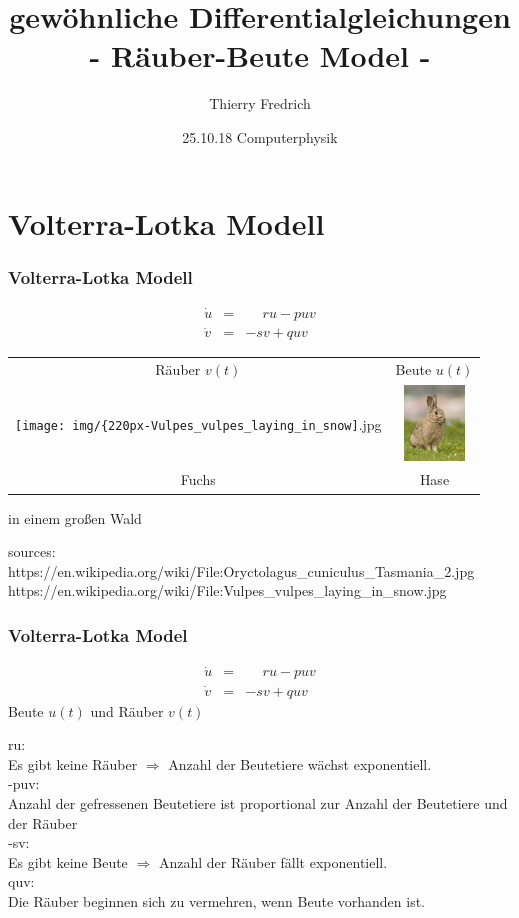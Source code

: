 \documentclass{beamer}
\title[Räuber-Beute Model]{gewöhnliche Differentialgleichungen\\- Räuber-Beute Model -}
\author[T. Fredrich]{Thierry Fredrich}
\institute[Uni Saarland]{Saarland University}
\date[25.10.18]{25.10.18 Computerphysik}
\begin{document}
\frame{\titlepage}

\section{Volterra-Lotka Modell}
\frame
{
  \frametitle{Volterra-Lotka Modell}
\begin{eqnarray}
 \dot u &=& \phantom{-} r u - p u v\nonumber\\
 \dot v &=& - s v + q u v \nonumber
\end{eqnarray}

\begin{center}
\begin{tabular}{cc}
 Räuber $v(t)$ & Beute $u(t)$\\ 
 \texttt{[image: img/\{220px-Vulpes\_vulpes\_laying\_in\_snow]}.jpg} & \includegraphics[height=2cm]{img/Oryctolagus_cuniculus_Tasmania_2.jpg}\\ 
 Fuchs & Hase 
\end{tabular}
\end{center}
\begin{flushright}
 in einem großen Wald
\end{flushright}
\scriptsize{sources:\\}
\scriptsize{https://en.wikipedia.org/wiki/File:Oryctolagus\_cuniculus\_Tasmania\_2.jpg}
\scriptsize{https://en.wikipedia.org/wiki/File:Vulpes\_vulpes\_laying\_in\_snow.jpg}

}


\frame
{
  \frametitle{Volterra-Lotka Model}
\begin{eqnarray}
 \dot u &=& \phantom{-} r u - p u v\nonumber\\
 \dot v &=& - s v + q u v \nonumber
\end{eqnarray}
Beute $u(t)$ und Räuber $v(t)$\newline\newline

ru:\\
Es gibt keine Räuber $\Rightarrow$ Anzahl der Beutetiere wächst exponentiell.\\
-puv:\\
Anzahl der gefressenen Beutetiere ist proportional zur Anzahl der Beutetiere und der Räuber\\
-sv:\\
Es gibt keine Beute $\Rightarrow$ Anzahl der Räuber fällt exponentiell.\\
quv:\\
Die Räuber beginnen sich zu vermehren, wenn Beute vorhanden ist.
}
\end{document}

